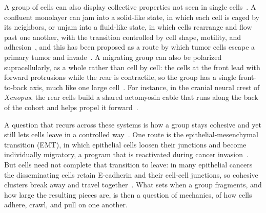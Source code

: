 A group of cells can also display collective properties not seen in single cells~\cite{cheung2025collective}.
A confluent monolayer can jam into a solid-like state, in which each cell is caged by its neighbors, or unjam into a fluid-like state, in which cells rearrange and flow past one another, with the transition controlled by cell shape, motility, and adhesion~\cite{park2015unjamming, bi2016motility, rustarazo2026adhesion}, and this has been proposed as a route by which tumor cells escape a primary tumor and invade~\cite{cai2025unjamming}.
A migrating group can also be polarized supracellularly, as a whole rather than cell by cell: the cells at the front lead with forward protrusions while the rear is contractile, so the group has a single front-to-back axis, much like one large cell~\cite{friedl2009collective, cheung2025collective}.
For instance, in the cranial neural crest of \textit{Xenopus}, the rear cells build a shared actomyosin cable that runs along the back of the cohort and helps propel it forward~\cite{cheung2025collective}.

A question that recurs across these systems is how a group stays cohesive and yet still lets cells leave in a controlled way~\cite{friedl2009collective, cheung2025collective}.
One route is the epithelial-mesenchymal transition (EMT), in which epithelial cells loosen their junctions and become individually migratory, a program that is reactivated during cancer invasion~\cite{youssef2024epithelial, tripathi2020physics}.
But cells need not complete that transition to leave: in many epithelial cancers the disseminating cells retain E-cadherin and their cell-cell junctions, so cohesive clusters break away and travel together~\cite{cheung2025collective}.
What sets when a group fragments, and how large the resulting pieces are, is then a question of mechanics, of how cells adhere, crawl, and pull on one another.

